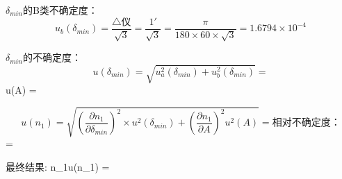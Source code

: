 ${\delta}_{min}$的B类不确定度：
$$u_b({\delta}_{min})=\displaystyle\frac{\bigtriangleup\text{仪}}{\sqrt{3}}
= \frac{1'}{\sqrt{3}} = \frac{\pi}{180\times60\times\sqrt{3}} = 1.6794 \times 10^{-4} $$

${\delta}_{min}$的不确定度：
$$u({\delta}_{min}) = \sqrt{u^2_a({\delta}_{min})+u^2_b({\delta}_{min})} = %

$$u(A) = %

$$u(n_1) = \sqrt{(\displaystyle\frac{{\partial}n_1}{{\partial}{\delta}_{min}})^2{\times}u^2({\delta}_{min})+(\displaystyle\frac{{\partial}n_1}{{\partial}A})^2u^2(A)} = %

相对不确定度：
$$\displaystyle{} = %

最终结果:
$${n_1}{\pm}u({n_1}) = %